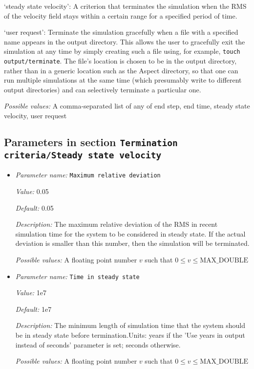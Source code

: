 \begin{itemize}
`steady state velocity': A criterion that terminates the simulation when the RMS of the velocity field stays within a certain range for a specified period of time.

`user request': Terminate the simulation gracefully when a file with a specified name appears in the output directory. This allows the user to gracefully exit the simulation at any time by simply creating such a file using, for example, \texttt{touch output/terminate}. The file's location is chosen to be in the output directory, rather than in a generic location such as the Aspect directory, so that one can run multiple simulations at the same time (which presumably write to different output directories) and can selectively terminate a particular one.


{\it Possible values:} A comma-separated list of any of end step, end time, steady state velocity, user request
\end{itemize}



\subsection{Parameters in section \tt Termination criteria/Steady state velocity}
\label{parameters:Termination_20criteria/Steady_20state_20velocity}

\begin{itemize}
\item {\it Parameter name:} {\tt Maximum relative deviation}
\label{parameters:Termination criteria/Steady state velocity/Maximum relative deviation}


{\it Value:} 0.05


{\it Default:} 0.05


{\it Description:} The maximum relative deviation of the RMS in recent simulation time for the system to be considered in steady state. If the actual deviation is smaller than this number, then the simulation will be terminated.


{\it Possible values:} A floating point number $v$ such that $0 \leq v \leq \text{MAX\_DOUBLE}$
\item {\it Parameter name:} {\tt Time in steady state}
\label{parameters:Termination criteria/Steady state velocity/Time in steady state}


{\it Value:} 1e7


{\it Default:} 1e7


{\it Description:} The minimum length of simulation time that the system should be in steady state before termination.Units: years if the 'Use years in output instead of seconds' parameter is set; seconds otherwise.


{\it Possible values:} A floating point number $v$ such that $0 \leq v \leq \text{MAX\_DOUBLE}$
\end{itemize}


